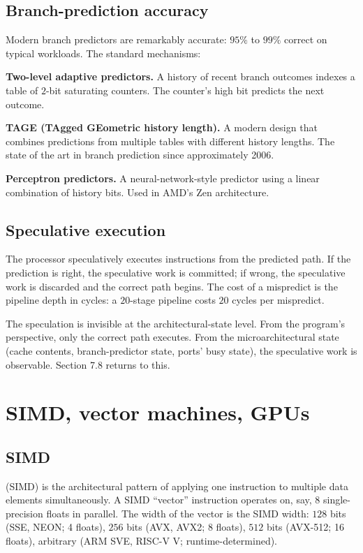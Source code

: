 \subsection{Branch-prediction accuracy}

Modern branch predictors are remarkably accurate: $95\%$ to $99\%$ correct on typical workloads. The standard mechanisms:

\textbf{Two-level adaptive predictors.} A history of recent branch outcomes indexes a table of $2$-bit saturating counters. The counter's high bit predicts the next outcome.

\textbf{TAGE (TAgged GEometric history length).} A modern design that combines predictions from multiple tables with different history lengths. The state of the art in branch prediction since approximately 2006.

\textbf{Perceptron predictors.} A neural-network-style predictor using a linear combination of history bits. Used in AMD's Zen architecture.

\subsection{Speculative execution}

The processor speculatively executes instructions from the predicted path. If the prediction is right, the speculative work is committed; if wrong, the speculative work is discarded and the correct path begins. The cost of a mispredict is the pipeline depth in cycles: a $20$-stage pipeline costs $20$ cycles per mispredict.

The speculation is invisible at the architectural-state level. From the program's perspective, only the correct path executes. From the microarchitectural state (cache contents, branch-predictor state, ports' busy state), the speculative work is observable. Section 7.8 returns to this.

\section{SIMD, vector machines, GPUs}

\subsection{SIMD}

 (SIMD) is the architectural pattern of applying one instruction to multiple data elements simultaneously. A SIMD ``vector'' instruction operates on, say, $8$ single-precision floats in parallel. The width of the vector is the SIMD width: $128$ bits (SSE, NEON; 4 floats), $256$ bits (AVX, AVX2; 8 floats), $512$ bits (AVX-512; 16 floats), arbitrary (ARM SVE, RISC-V V; runtime-determined).

